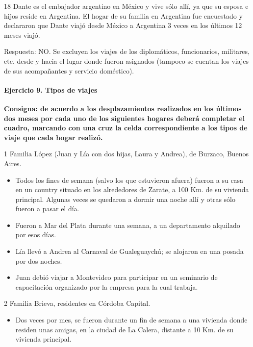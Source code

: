 \documentclass[
  openany]{book}
\providecommand{\tightlist}{%
  \setlength{\itemsep}{0pt}\setlength{\parskip}{0pt}}
\begin{document}
18 Dante es el embajador argentino en México y vive sólo allí, ya que su esposa e hijos reside en Argentina. El hogar de su familia en Argentina fue encuestado y declararon que Dante viajó desde México a Argentina 3 veces en los últimos 12 meses viajó.

Respuesta: NO. Se excluyen los viajes de los diplomáticos, funcionarios, militares, etc. desde y hacia el lugar donde fueron asignados (tampoco se cuentan los viajes de sus acompañantes y servicio doméstico).

\hypertarget{ejercicio-9.-tipos-de-viajes-1}{%
\paragraph{Ejercicio 9. Tipos de viajes}\label{ejercicio-9.-tipos-de-viajes-1}}

\textbf{Consigna: de acuerdo a los desplazamientos realizados en los últimos dos meses por cada uno de los siguientes hogares deberá completar el cuadro, marcando con una cruz la celda correspondiente a los tipos de viaje que cada hogar realizó.}

1 Familia López (Juan y Lía con dos hijas, Laura y Andrea), de Burzaco, Buenos Aires.

\begin{itemize}
\item
  Todos los fines de semana (salvo los que estuvieron afuera) fueron a su casa en un country situado en los alrededores de Zarate, a 100 Km. de su vivienda principal. Algunas veces se quedaron a dormir una noche allí y otras sólo fueron a pasar el día.
\item
  Fueron a Mar del Plata durante una semana, a un departamento alquilado por esos días.
\item
  Lía llevó a Andrea al Carnaval de Gualeguaychú; se alojaron en una posada por dos noches.
\item
  Juan debió viajar a Montevideo para participar en un seminario de capacitación organizado por la empresa para la cual trabaja.
\end{itemize}

2 Familia Brieva, residentes en Córdoba Capital.

\begin{itemize}
\tightlist
\item
  Dos veces por mes, se fueron durante un fin de semana a una vivienda donde residen unas amigas, en la ciudad de La Calera, distante a 10 Km. de su vivienda principal.
\end{itemize}
\end{document}
